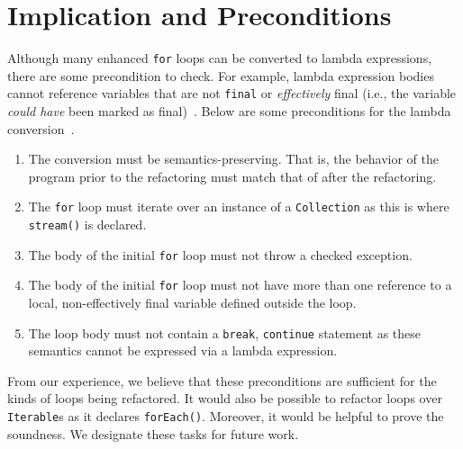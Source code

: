 \section{Implication and Preconditions}

Although many enhanced \lstinline{for} loops can be converted to lambda
expressions, there are some precondition to check. For example, lambda
expression bodies cannot reference variables that are not \lstinline{final} or
\emph{effectively} final (i.e., the variable \emph{could have} been marked as
final)~\cite{gosling2014java}.  Below are some preconditions for the lambda
conversion~\cite{gyori2013}. 

\begin{enumerate}

    \item The conversion must be semantics-preserving. That is, the behavior
        of the program prior to the refactoring must match that of after the
        refactoring.

    \item The \lstinline{for} loop must iterate over an instance of a
        \lstinline{Collection} as this is where \lstinline{stream()} is
        declared.

    \item The body of the initial \lstinline{for} loop must not throw a
        checked exception. 

    \item The body of the initial \lstinline{for} loop must not have more than
        one reference to a local, non-effectively final variable defined
        outside the loop.

    \item The loop body must not contain a \lstinline{break},
        \lstinline{continue} statement as these semantics cannot be expressed
        via a lambda expression.  

\end{enumerate}

From our experience, we believe that these preconditions are sufficient for
the kinds of loops being refactored. It would also be possible to refactor
loops over \lstinline{Iterable}s as it declares \lstinline{forEach()}.
Moreover, it would be helpful to prove the soundness. We designate these tasks
for future work.
